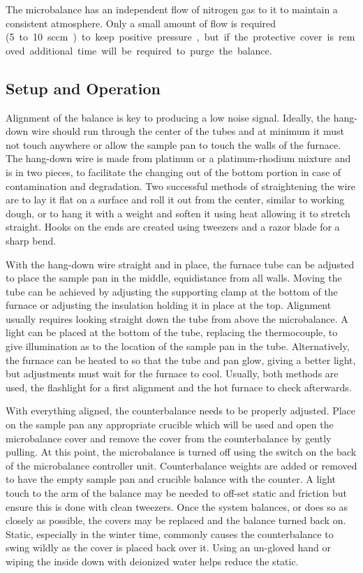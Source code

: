     The microbalance has an independent flow of nitrogen gas to it to maintain a consistent atmosphere.
    Only a small amount of flow is required (\SI{5} to \SI{10}{sccm}) to keep positive pressure, but if the protective cover is removed additional time will be required to purge the balance.

    \subsection{Setup and Operation}
        Alignment of the balance is key to producing a low noise signal.
        Ideally, the hang-down wire should run through the center of the tubes and at minimum it must not touch anywhere or allow the sample pan to touch the walls of the furnace.
        The hang-down wire is made from platinum or a platinum-rhodium mixture and is in two pieces, to facilitate the changing out of the bottom portion in case of contamination and degradation.
        Two successful methods of straightening the wire are to lay it flat on a surface and roll it out from the center, similar to working dough, or to hang it with a weight and soften it using heat allowing it to stretch straight.
        Hooks on the ends are created using tweezers and a razor blade for a sharp bend.

        With the hang-down wire straight and in place, the furnace tube can be adjusted to place the sample pan in the middle, equidistance from all walls.
        Moving the tube can be achieved by adjusting the supporting clamp at the bottom of the furnace or adjusting the insulation holding it in place at the top.
        Alignment usually requires looking straight down the tube from above the microbalance.
        A light can be placed at the bottom of the tube, replacing the thermocouple, to give illumination as to the location of the sample pan in the tube.
        Alternatively, the furnace can be heated to  so that the tube and pan glow, giving a better light, but adjustments must wait for the furnace to cool.
        Usually, both methods are used, the flashlight for a first alignment and the hot furnace to check afterwards.

        With everything aligned, the counterbalance needs to be properly adjusted.
        Place on the sample pan any appropriate crucible which will be used and open the microbalance cover and remove the cover from the counterbalance by gently pulling.
        At this point, the microbalance is turned off using the switch on the back of the microbalance controller unit.
        Counterbalance weights are added or removed to have the empty sample pan and crucible balance with the counter.
        A light touch to the arm of the balance may be needed to off-set static and friction but ensure this is done with clean tweezers.
        Once the system balances, or does so as closely as possible, the covers may be replaced and the balance turned back on.
        Static, especially in the winter time, commonly causes the counterbalance to swing wildly as the cover is placed back over it.
        Using an un-gloved hand or wiping the inside down with deionized water helps reduce the static.

